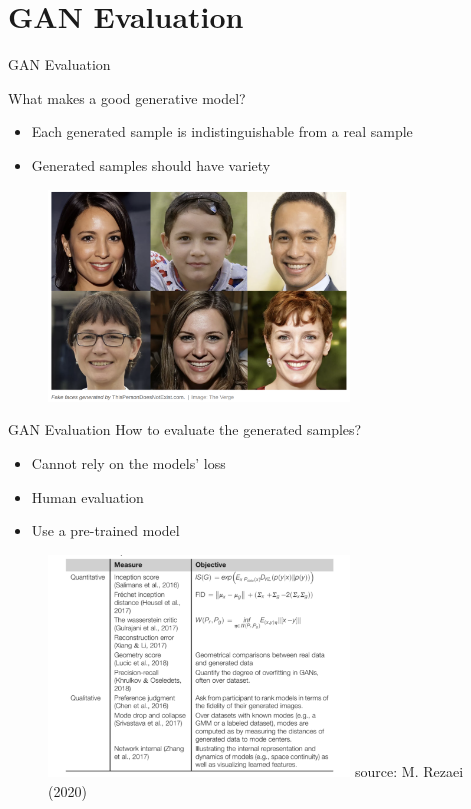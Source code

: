 \section{GAN Evaluation}

\begin{frame} {GAN Evaluation}

What makes a good generative model?
  \begin{itemize}
    \item Each generated sample is indistinguishable from a real sample
    \item Generated samples should have variety
  \end{itemize}
  
   \begin{figure}
    \centering
    \includegraphics[width=8cm]{plots/exampleGAN.png}
   \end{figure}
\end{frame}


\begin{frame} {GAN Evaluation}
\vspace{2mm}
How to evaluate the generated samples?

  \begin{itemize}
 \item Cannot rely on the models' loss 
 \item Human evaluation
 \item Use a pre-trained model
  \end{itemize}
  
   \begin{figure}
    \centering
    \includegraphics[width=8cm]{plots/evaluationGAN.png}
        \centering \tiny{source: M. Rezaei (2020) }
   \end{figure}
   
\end{frame}


